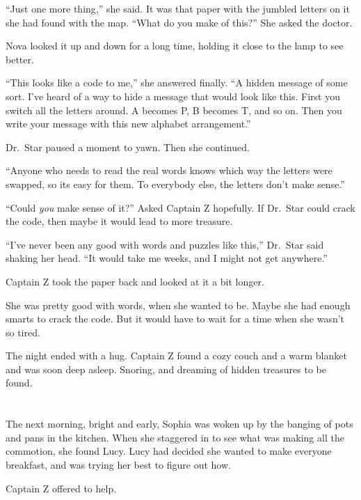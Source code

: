 \documentclass[12pt]{extbook}
\begin{document}
  \enquote{Just one more thing,} she said. It was that paper with the
  jumbled letters on it she had found with the map. \enquote{What do you
  make of this?} She asked the doctor.
  
  Nova looked it up and down for a long time, holding it close to the lamp
  to see better.
  
  \enquote{This looks like a code to me,} she answered finally. \enquote{A
  hidden message of some sort. I've heard of a way to hide a message that
  would look like this. First you switch all the letters around. A becomes
  P, B becomes T, and so on. Then you write your message with this new
  alphabet arrangement.}
  
  Dr.~Star paused a moment to yawn. Then she continued.
  
  \enquote{Anyone who needs to read the real words knows which way the
  letters were swapped, so its easy for them. To everybody else, the
  letters don't make sense.}
  
  \enquote{Could \emph{you} make sense of it?} Asked Captain Z hopefully.
  If Dr.~Star could crack the code, then maybe it would lead to more
  treasure.
  
  \enquote{I've never been any good with words and puzzles like this,}
  Dr.~Star said shaking her head. \enquote{It would take me weeks, and I
  might not get anywhere.}
  
  Captain Z took the paper back and looked at it a bit longer.
  
  She was pretty good with words, when she wanted to be. Maybe she had
  enough smarts to crack the code. But it would have to wait for a time
  when she wasn't so tired.
  
  The night ended with a hug. Captain Z found a cozy couch and a warm
  blanket and was soon deep asleep. Snoring, and dreaming of hidden
  treasures to be found.
  
  \section{}\label{section-29}
  
  The next morning, bright and early, Sophia was woken up by the banging
  of pots and pans in the kitchen. When she staggered in to see what was
  making all the commotion, she found Lucy. Lucy had decided she wanted to
  make everyone breakfast, and was trying her best to figure out how.
  
  Captain Z offered to help.
  
\end{document}
